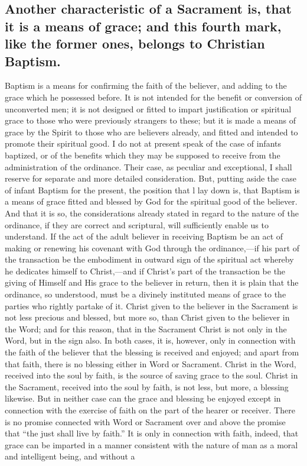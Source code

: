 \documentclass[]{book}
\begin{document}
\hypertarget{another-characteristic-of-a-sacrament-is-that-it-is-a-means-of-grace-and-this-fourth-mark-like-the-former-ones-belongs-to-christian-baptism.}{%
\subsection{Another characteristic of a Sacrament is, that it is a means of grace; and this fourth mark, like the former ones, belongs to Christian Baptism.}\label{another-characteristic-of-a-sacrament-is-that-it-is-a-means-of-grace-and-this-fourth-mark-like-the-former-ones-belongs-to-christian-baptism.}}

Baptism is a means for confirming the faith of the believer, and adding to the grace which he possessed before. It is not intended for the benefit or conversion of unconverted men; it is not designed or fitted to impart justification or spiritual grace to those who were previously strangers to these; but it is made a means of grace by the Spirit to those who are believers already, and fitted and intended to promote their spiritual good. I do not at present speak of the case of infants baptized, or of the benefits which they may be supposed to receive from the administration of the ordinance. Their case, as peculiar and exceptional, I shall reserve for separate and more detailed consideration. But, putting aside the case of infant Baptism for the present, the position that l lay down is, that Baptism is a means of grace fitted and blessed by God for the spiritual good of the believer. And that it is so, the considerations already stated in regard to the nature of the ordinance, if they are correct and scriptural, will sufficiently enable us to understand. If the act of the adult believer in receiving Baptism be an act of making or renewing his covenant with God through the ordinance,---if his part of the transaction be the embodiment in outward sign of the spiritual act whereby he dedicates himself to Christ,---and if Christ's part of the transaction be the giving of Himself and His grace to the believer in return, then it is plain that the ordinance, so understood, must be a divinely instituted means of grace to the parties who rightly partake of it. Christ given to the believer in the Sacrament is not less precious and blessed, but more so, than Christ given to the believer in the Word; and for this reason, that in the Sacrament Christ is not only in the Word, but in the sign also. In both cases, it is, however, only in connection with the faith of the believer that the blessing is received and enjoyed; and apart from that faith, there is no blessing either in Word or Sacrament. Christ in the Word, received into the soul by faith, is the source of saving grace to the soul. Christ in the Sacrament, received into the soul by faith, is not less, but more, a blessing likewise. But in neither case can the grace and blessing be enjoyed except in connection with the exercise of faith on the part of the hearer or receiver. There is no promise connected with Word or Sacrament over and above the promise that ``the just shall live by faith.'' It is only in connection with faith, indeed, that grace can be imparted in a manner consistent with the nature of man as a moral and intelligent being, and without a 
\end{document}
